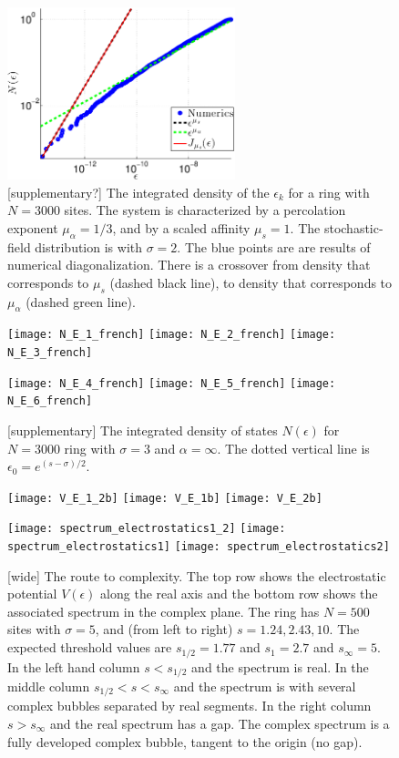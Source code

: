 \documentclass[aps,pre,floats,floatfix,twocolumn]{revtex4}
\newcommand{\rmrk}[1]{{\color[rgb]{0.6,0,0.1} #1}}
\begin{document}
\begin{figure}
\includegraphics[height=5cm]{N_E_1_1_french.eps}

\caption{\label{fig2}\rmrk{[supplementary?]}
The integrated density of the $\epsilon_k$ for a ring with $N{=}3000$ sites. 
The system is characterized by a percolation exponent ${\mu_{\alpha} = 1/3}$, 
and by a scaled affinity ${\mu_s = 1}$. 
The stochastic-field distribution is with $\sigma{=}2$. 
The blue points are are results of numerical diagonalization. 
There is a crossover from density that corresponds to $\mu_s$ (dashed black line), 
to density that corresponds to $\mu_{\alpha}$ (dashed green line). 
}
\end{figure}


\begin{figure}
\texttt{[image: N\_E\_1\_french]}
\texttt{[image: N\_E\_2\_french]}
\texttt{[image: N\_E\_3\_french]}

\texttt{[image: N\_E\_4\_french]}
\texttt{[image: N\_E\_5\_french]}
\texttt{[image: N\_E\_6\_french]}

\caption{\rmrk{[supplementary]}
The integrated density of states $N(\epsilon)$ for $N{=}3000$ ring 
with $\sigma{=}3$ and $\alpha{=}\infty$. 
The dotted vertical line is ${\epsilon_0=e^{(s-\sigma)/2}}$.
}
\end{figure}



\begin{figure}
\texttt{[image: V\_E\_1\_2b]}
\texttt{[image: V\_E\_1b]}
\texttt{[image: V\_E\_2b]}

\texttt{[image: spectrum\_electrostatics1\_2]}
\texttt{[image: spectrum\_electrostatics1]}
\texttt{[image: spectrum\_electrostatics2]}

\caption{\label{f2} \rmrk{[wide]}
The route to complexity. 
The top row shows the electrostatic potential $V(\epsilon)$ along the real axis 
and the bottom row shows the associated spectrum in the complex plane. 
The ring has $N{=}500$ sites with $\sigma{=}5$, 
and (from left to right) ${s=1.24, 2.43, 10}$. 
The expected threshold values are ${s_{1/2}=1.77}$ and ${s_1=2.7}$ and ${s_{\infty}=5}$.
In the left hand column ${s<s_{1/2}}$ and the spectrum is real.
In the middle column ${s_{1/2} < s < s_{\infty}}$ and the spectrum is  
with several complex bubbles separated by real segments. 
In the right column  ${s>s_{\infty}}$ and the real spectrum has a gap.
The complex spectrum is a fully developed complex bubble, 
tangent to the origin (no gap). 
}
\end{figure}
\end{document}
